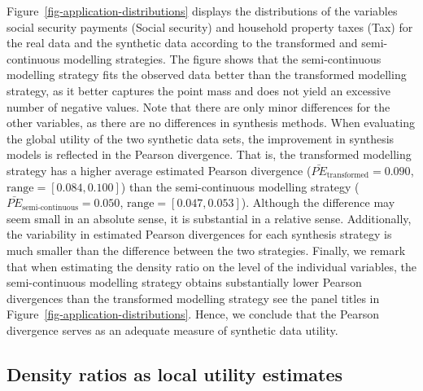 \documentclass[
]{article}
\begin{document}
Figure~\ref{fig-application-distributions} displays the distributions of
the variables social security payments (Social security) and household
property taxes (Tax) for the real data and the synthetic data according
to the transformed and semi-continuous modelling strategies. The figure
shows that the semi-continuous modelling strategy fits the observed data
better than the transformed modelling strategy, as it better captures
the point mass and does not yield an excessive number of negative
values. Note that there are only minor differences for the other
variables, as there are no differences in synthesis methods. When
evaluating the global utility of the two synthetic data sets, the
improvement in synthesis models is reflected in the Pearson divergence.
That is, the transformed modelling strategy has a higher average
estimated Pearson divergence (\(\bar{PE}_\text{transformed} = 0.090\),
\(\text{range} = [0.084, 0.100]\)) than the semi-continuous modelling
strategy (\(\bar{PE}_\text{semi-continuous} = 0.050\),
\(\text{range} = [0.047, 0.053]\)). Although the difference may seem
small in an absolute sense, it is substantial in a relative sense.
Additionally, the variability in estimated Pearson divergences for each
synthesis strategy is much smaller than the difference between the two
strategies. Finally, we remark that when estimating the density ratio on
the level of the individual variables, the semi-continuous modelling
strategy obtains substantially lower Pearson divergences than the
transformed modelling strategy see the panel titles in
Figure~\ref{fig-application-distributions}. Hence, we conclude that the
Pearson divergence serves as an adequate measure of synthetic data
utility.

\subsection{Density ratios as local utility
estimates}\label{density-ratios-as-local-utility-estimates}

\linespread{1}
\end{document}
